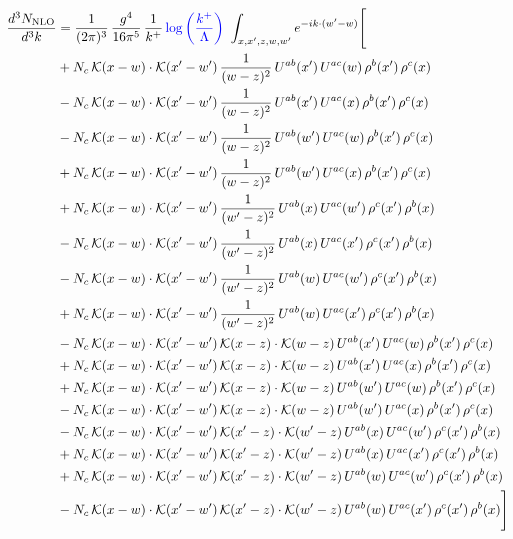 \documentclass[9pt]{article}
\numberwithin{equation}{section}
\begin{document}
\begin{align}
\frac{d^3N_{\rm NLO}}{d^3k} & =  \frac{1}{(2\pi)^{3}}\,\frac{g^{4}}{16\pi^{5}}\,\frac{1}{k^{+}}\,{\color{blue}\log{\left(\frac{k^{+}}{\Lambda}\right)}}\,\, \int_{x,x',z,w,w'}e^{-ik\cdot(w'-w)}\Bigg[\notag\\
&+N_{c}\,\mathcal{K}(x-w)\cdot\mathcal{K}(x'-w')\,\frac{1}{(w-z)^{2}}\,U^{ab}(x')\,U^{ac}(w)\,\rho^{b}(x')\,\rho^{c}(x)\notag\\
&-N_{c}\,\mathcal{K}(x-w)\cdot\mathcal{K}(x'-w')\,\frac{1}{(w-z)^{2}}\,U^{ab}(x')\,U^{ac}(x)\,\rho^{b}(x')\,\rho^{c}(x)\notag\\
&-N_{c}\,\mathcal{K}(x-w)\cdot\mathcal{K}(x'-w')\,\frac{1}{(w-z)^{2}}\,U^{ab}(w')\,U^{ac}(w)\,\rho^{b}(x')\,\rho^{c}(x)\notag\\
&+N_{c}\,\mathcal{K}(x-w)\cdot\mathcal{K}(x'-w')\,\frac{1}{(w-z)^{2}}\,U^{ab}(w')\,U^{ac}(x)\,\rho^{b}(x')\,\rho^{c}(x)\notag\\
&+N_{c}\,\mathcal{K}(x-w)\cdot\mathcal{K}(x'-w')\,\frac{1}{(w'-z)^{2}}\,U^{ab}(x)\,U^{ac}(w')\,\rho^{c}(x')\,\rho^{b}(x)\notag\\
&-N_{c}\,\mathcal{K}(x-w)\cdot\mathcal{K}(x'-w')\,\frac{1}{(w'-z)^{2}}\,U^{ab}(x)\,U^{ac}(x')\,\rho^{c}(x')\,\rho^{b}(x)\notag\\
&-N_{c}\,\mathcal{K}(x-w)\cdot\mathcal{K}(x'-w')\,\frac{1}{(w'-z)^{2}}\,U^{ab}(w)\,U^{ac}(w')\,\rho^{c}(x')\,\rho^{b}(x)\notag\\
&+N_{c}\,\mathcal{K}(x-w)\cdot\mathcal{K}(x'-w')\,\frac{1}{(w'-z)^{2}}\,U^{ab}(w)\,U^{ac}(x')\,\rho^{c}(x')\,\rho^{b}(x)\notag\\
&-N_{c}\,\mathcal{K}(x-w)\cdot\mathcal{K}(x'-w')\,\mathcal{K}(x-z)\cdot\mathcal{K}(w-z)\,U^{ab}(x')\,U^{ac}(w)\,\rho^{b}(x')\,\rho^{c}(x)\notag\\
&+N_{c}\,\mathcal{K}(x-w)\cdot\mathcal{K}(x'-w')\,\mathcal{K}(x-z)\cdot\mathcal{K}(w-z)\,U^{ab}(x')\,U^{ac}(x)\,\rho^{b}(x')\,\rho^{c}(x)\notag\\
&+N_{c}\,\mathcal{K}(x-w)\cdot\mathcal{K}(x'-w')\,\mathcal{K}(x-z)\cdot\mathcal{K}(w-z)\,U^{ab}(w')\,U^{ac}(w)\,\rho^{b}(x')\,\rho^{c}(x)\notag\\
&-N_{c}\,\mathcal{K}(x-w)\cdot\mathcal{K}(x'-w')\,\mathcal{K}(x-z)\cdot\mathcal{K}(w-z)\,U^{ab}(w')\,U^{ac}(x)\,\rho^{b}(x')\,\rho^{c}(x)\notag\\
&-N_{c}\,\mathcal{K}(x-w)\cdot\mathcal{K}(x'-w')\,\mathcal{K}(x'-z)\cdot\mathcal{K}(w'-z)\,U^{ab}(x)\,U^{ac}(w')\,\rho^{c}(x')\,\rho^{b}(x)\notag\\
&+N_{c}\,\mathcal{K}(x-w)\cdot\mathcal{K}(x'-w')\,\mathcal{K}(x'-z)\cdot\mathcal{K}(w'-z)\,U^{ab}(x)\,U^{ac}(x')\,\rho^{c}(x')\,\rho^{b}(x)\notag\\
&+N_{c}\,\mathcal{K}(x-w)\cdot\mathcal{K}(x'-w')\,\mathcal{K}(x'-z)\cdot\mathcal{K}(w'-z)\,U^{ab}(w)\,U^{ac}(w')\,\rho^{c}(x')\,\rho^{b}(x)\notag\\
&-N_{c}\,\mathcal{K}(x-w)\cdot\mathcal{K}(x'-w')\,\mathcal{K}(x'-z)\cdot\mathcal{K}(w'-z)\,U^{ab}(w)\,U^{ac}(x')\,\rho^{c}(x')\,\rho^{b}(x)\Bigg]
\end{align}
\end{document}
